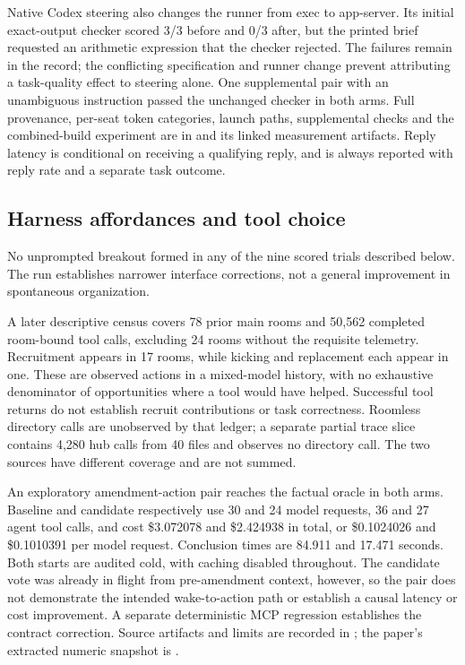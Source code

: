 Native Codex steering also changes the runner from exec to app-server. Its initial exact-output checker scored 3/3 before and 0/3 after, but the printed brief requested an arithmetic expression that the checker rejected. The failures remain in the record; the conflicting specification and runner change prevent attributing a task-quality effect to steering alone. One supplemental pair with an unambiguous instruction passed the unchanged checker in both arms. Full provenance, per-seat token categories, launch paths, supplemental checks and the combined-build experiment are in  and its linked measurement artifacts. Reply latency is conditional on receiving a qualifying reply, and is always reported with reply rate and a separate task outcome.


\subsection{Harness affordances and tool choice}
\label{sec:results-harness-affordances}

No unprompted breakout formed in any of the nine scored trials described below. The run establishes narrower interface corrections, not a general improvement in spontaneous organization.

A later descriptive census covers 78 prior main rooms and 50,562 completed room-bound tool calls, excluding 24 rooms without the requisite telemetry. Recruitment appears in 17 rooms, while kicking and replacement each appear in one. These are observed actions in a mixed-model history, with no exhaustive denominator of opportunities where a tool would have helped. Successful tool returns do not establish recruit contributions or task correctness. Roomless directory calls are unobserved by that ledger; a separate partial trace slice contains 4,280 hub calls from 40 files and observes no directory call. The two sources have different coverage and are not summed.

An exploratory amendment-action pair reaches the factual oracle in both arms. Baseline and candidate respectively use 30 and 24 model requests, 36 and 27 agent tool calls, and cost \$3.072078 and \$2.424938 in total, or \$0.1024026 and \$0.1010391 per model request. Conclusion times are 84.911 and 17.471 seconds. Both starts are audited cold, with caching disabled throughout. The candidate vote was already in flight from pre-amendment context, however, so the pair does not demonstrate the intended wake-to-action path or establish a causal latency or cost improvement. A separate deterministic MCP regression establishes the contract correction. Source artifacts and limits are recorded in ; the paper's extracted numeric snapshot is .


